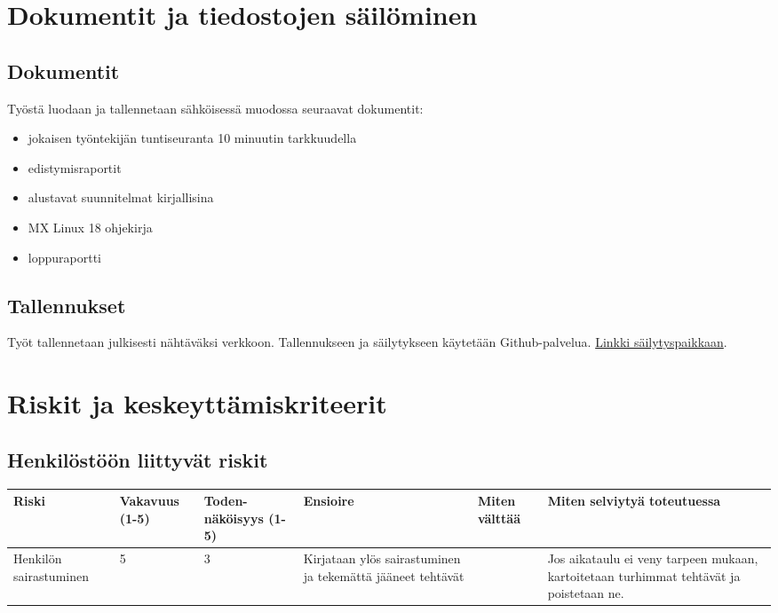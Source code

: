 \documentclass[a4paper, 12pt, finnish]{article}
\begin{document}
\section{Dokumentit ja tiedostojen säilöminen}

\subsection{Dokumentit}

Työstä luodaan ja tallennetaan sähköisessä muodossa seuraavat dokumentit:
\begin{itemize}
    \item jokaisen työntekijän tuntiseuranta 10 minuutin tarkkuudella
    \item edistymisraportit
    \item alustavat suunnitelmat kirjallisina
    \item MX Linux 18 ohjekirja
    \item loppuraportti
\end{itemize}

\subsection{Tallennukset}

Työt tallennetaan julkisesti nähtäväksi verkkoon. Tallennukseen ja säilytykseen käytetään Github-palvelua. \href{http://github.com/maysion/mxlinux18}{Linkki säilytyspaikkaan}.

\section{Riskit ja keskeyttämiskriteerit}
\subsection{Henkilöstöön liittyvät riskit}
\begin{table}[!htpb]
\begin{tabularx}{1.1\textwidth}{|X|X|X|X|X|X|}
\hline
\rowcolor[HTML]{EFEFEF}
\textbf{Riski} & \textbf{Vakavuus (1-5)} & \textbf{Toden-näköisyys (1-5)} & \textbf{Ensioire} & \textbf{Miten välttää} & \textbf{Miten selviytyä toteutuessa} \\ \hline
Henkilön sairastuminen & 5 & 3 & Kirjataan ylös sairastuminen ja tekemättä jääneet tehtävät &  & Jos aikataulu ei veny tarpeen mukaan, kartoitetaan turhimmat tehtävät ja poistetaan ne. \\ \hline
\end{tabularx}
\end{table}
\clearpage
\end{document}
